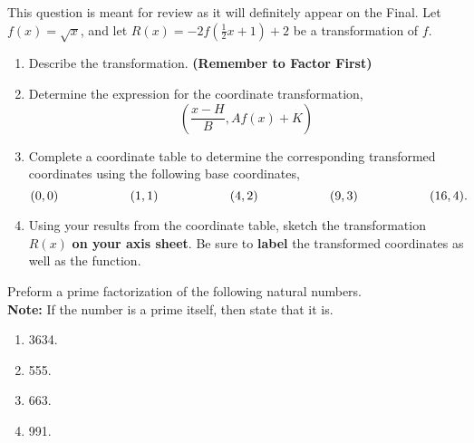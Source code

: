 \documentclass[12pt]{article} %
\begin{document}
  \begin{qstn}
    This question is meant for review as it will definitely appear on the Final. Let $f(x) = \sqrt{x} $, 
    and let $R(x) = -2f(\frac{1}{2}x + 1) + 2$ be a transformation of $f$. 
    \begin{enumerate}[label=(\alph*)]
      \item Describe the transformation. \textbf{(Remember to Factor First)}

      \item Determine the expression for the coordinate transformation,
        \[
            \left( \frac{x- H}{B}, Af(x) + K \right)
        \] 

      \item Complete a coordinate table to determine the corresponding transformed coordinates using the following
        base coordinates,
        \[
            (0,0) \hspace*{2cm} (1,1) \hspace*{2cm} (4,2) \hspace*{2cm} (9,3) \hspace*{2cm} (16,4)
        .\] 

     \item Using your results from the coordinate table, sketch the transformation $R(x)$ \textbf{on your axis
       sheet}. Be sure to \textbf{label} the transformed coordinates as well as the function.
    \end{enumerate}

  \end{qstn}


  \begin{qstn}
    Preform a prime factorization of the following natural numbers.\\
    \textbf{Note:} If the number is a prime itself, then state that it is.
    \begin{enumerate}[label=(\alph*)]
      \item 3634.
      \item 555.
      \item 663.
      \item 991.
    \end{enumerate}
  \end{qstn}
\end{document}
